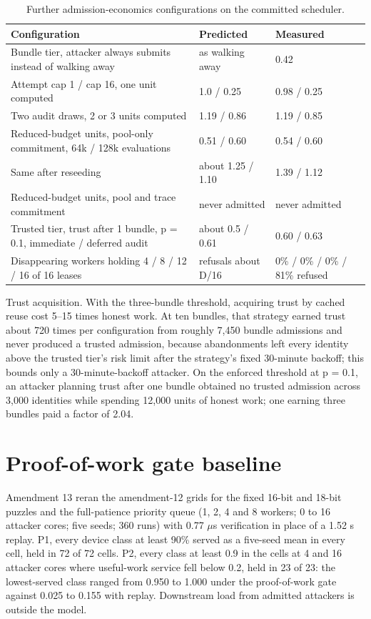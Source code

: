 \documentclass[11pt]{article}
\newcommand{\botrule}{\bottomrule}
\begin{document}
\begin{table}[htbp]
\caption{Further admission-economics configurations on the committed scheduler.}
\centering
\small
\begin{tabularx}{\textwidth}{XXX}
\toprule
Configuration & Predicted & Measured \\
\midrule
Bundle tier, attacker always submits instead of walking away & as walking away & 0.42 \\
Attempt cap 1 / cap 16, one unit computed & 1.0 / 0.25 & 0.98 / 0.25 \\
Two audit draws, 2 or 3 units computed & 1.19 / 0.86 & 1.19 / 0.85 \\
Reduced-budget units, pool-only commitment, 64k / 128k evaluations & 0.51 / 0.60 & 0.54 / 0.60 \\
Same after reseeding & about 1.25 / 1.10 & 1.39 / 1.12 \\
Reduced-budget units, pool and trace commitment & never admitted & never admitted \\
Trusted tier, trust after 1 bundle, p = 0.1, immediate / deferred audit & about 0.5 / 0.61 & 0.60 / 0.63 \\
Disappearing workers holding 4 / 8 / 12 / 16 of 16 leases & refusals about D/16 & 0\% / 0\% / 0\% / 81\% refused \\
\botrule
\end{tabularx}
\end{table}

Trust acquisition. With the three-bundle threshold, acquiring trust by cached reuse cost 5--15 times honest work. At ten bundles, that strategy earned trust about 720 times per configuration from roughly 7,450 bundle admissions and never produced a trusted admission, because abandonments left every identity above the trusted tier's risk limit after the strategy's fixed 30-minute backoff; this bounds only a 30-minute-backoff attacker. On the enforced threshold at p = 0.1, an attacker planning trust after one bundle obtained no trusted admission across 3,000 identities while spending 12,000 units of honest work; one earning three bundles paid a factor of 2.04.

\section{Proof-of-work gate baseline}

Amendment 13 reran the amendment-12 grids for the fixed 16-bit and 18-bit puzzles and the full-patience priority queue (1, 2, 4 and 8 workers; 0 to 16 attacker cores; five seeds; 360 runs) with 0.77 $\mu$s verification in place of a 1.52 s replay. P1, every device class at least 90\% served as a five-seed mean in every cell, held in 72 of 72 cells. P2, every class at least 0.9 in the cells at 4 and 16 attacker cores where useful-work service fell below 0.2, held in 23 of 23: the lowest-served class ranged from 0.950 to 1.000 under the proof-of-work gate against 0.025 to 0.155 with replay. Downstream load from admitted attackers is outside the model.
\end{document}
